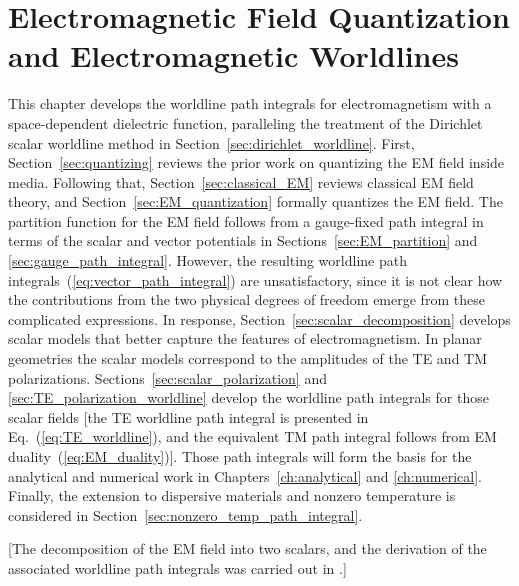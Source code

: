 \chapter[{Electromagnetic Field Quantization and \\ Electromagnetic Worldlines}]{Electromagnetic Field Quantization and Electromagnetic Worldlines}

\label{ch:EM_quantization}

This chapter develops the worldline path integrals for electromagnetism with a space-dependent
dielectric function, paralleling the treatment of the Dirichlet scalar worldline method in Section~\ref{sec:dirichlet_worldline}.  
First, Section~\ref{sec:quantizing} reviews the prior work on quantizing the EM field inside media.
Following that, Section~\ref{sec:classical_EM} reviews classical EM field theory, 
and Section~\ref{sec:EM_quantization} formally quantizes the EM field. 
The partition function for the EM field follows from a gauge-fixed path integral in terms of the scalar and vector potentials
in Sections~\ref{sec:EM_partition} and \ref{sec:gauge_path_integral}.
However, the resulting worldline path integrals~(\ref{eq:vector_path_integral}) are unsatisfactory, since
it is not clear how the contributions from the two physical degrees of freedom emerge from these complicated expressions. 
In response, Section~\ref{sec:scalar_decomposition} develops scalar models that better capture the features
of electromagnetism.
In planar geometries the scalar models correspond to the amplitudes of the TE and TM polarizations.  
Sections~\ref{sec:scalar_polarization} and \ref{sec:TE_polarization_worldline} develop the worldline path integrals for those scalar fields 
[the TE worldline path integral is presented in Eq.~(\ref{eq:TE_worldline}), 
and the equivalent TM path integral follows from EM duality~(\ref{eq:EM_duality})].
Those path integrals will form the basis for the analytical and numerical work in Chapters~\ref{ch:analytical} and \ref{ch:numerical}.  
Finally, the extension to dispersive materials and nonzero temperature is considered in Section~\ref{sec:nonzero_temp_path_integral}.

[The decomposition of the EM field into two scalars, and the derivation of the associated 
worldline path integrals was carried out in \citet{Mackrory2016}.]

